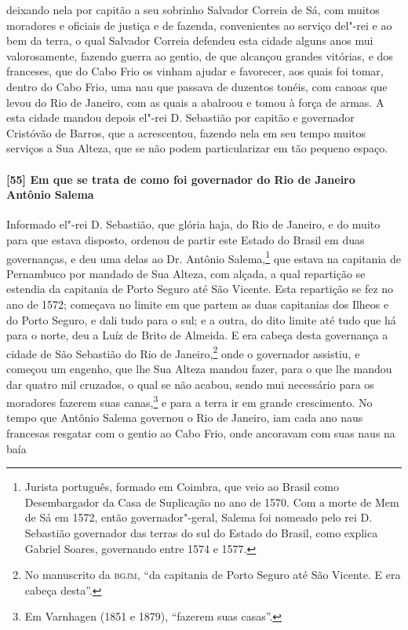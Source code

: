 deixando nela por capitão a seu sobrinho Salvador Correia de Sá, com muitos moradores e
oficiais de justiça e de fazenda, convenientes ao serviço del"-rei e ao bem da terra, o
qual Salvador Correia defendeu esta cidade alguns anos mui valorosamente, fazendo guerra
ao gentio, de que alcançou grandes vitórias, e dos franceses, que do Cabo Frio os vinham
ajudar e favorecer, aos quais foi tomar, dentro do Cabo Frio, uma nau que passava de
duzentos tonéis, com canoas que levou do Rio de Janeiro, com as quais a abalroou e tomou à
força de armas. A esta cidade mandou depois el"-rei D. Sebastião por capitão e governador
Cristóvão de Barros, que a acrescentou, fazendo nela em seu tempo muitos serviços a Sua
Alteza, que se não podem particularizar em tão pequeno espaço.

\paragraph{[55] Em que se trata de como foi governador do Rio de Janeiro Antônio Salema} \quad
Informado el"-rei D. Sebastião, que glória haja, do Rio de Janeiro, e do muito para que
estava disposto, ordenou de partir este Estado do Brasil em duas governanças, e deu uma
delas ao Dr. Antônio Salema,\footnote{ Jurista português, formado em Coimbra, que veio ao
Brasil como Desembargador da Casa de Suplicação no ano de 1570. Com a morte de Mem de Sá
em 1572, então governador"-geral, Salema foi nomeado pelo rei D. Sebastião governador das
terras do sul do Estado do Brasil, como explica Gabriel Soares, governando entre 1574 e
1577.} que estava na capitania de Pernambuco por mandado de Sua Alteza, com alçada, a
qual repartição se estendia da capitania de Porto Seguro até São Vicente. Esta repartição
se fez no ano de 1572; começava no limite em que partem as duas capitanias dos Ilheos e do
Porto Seguro, e dali tudo para o sul; e a outra, do dito limite até tudo que há para o
norte, deu a Luíz de Brito de Almeida. E era cabeça desta governança a cidade de São
Sebastião do Rio de Janeiro,\footnote{ No manuscrito da \textsc{bgjm}, ``da capitania de
Porto Seguro até São Vicente. E era cabeça desta''.} onde o governador assistiu, e começou
um engenho, que lhe Sua Alteza mandou fazer, para o que lhe mandou dar quatro mil
cruzados, o qual se não acabou, sendo mui necessário para os moradores fazerem suas
canas,\footnote{ Em Varnhagen (1851 e 1879), ``fazerem suas casas''.} e para a terra ir em
grande crescimento. No tempo que Antônio Salema governou o Rio de Janeiro, iam cada ano
naus francesas resgatar com o gentio ao Cabo Frio, onde ancoravam com suas naus na baía
